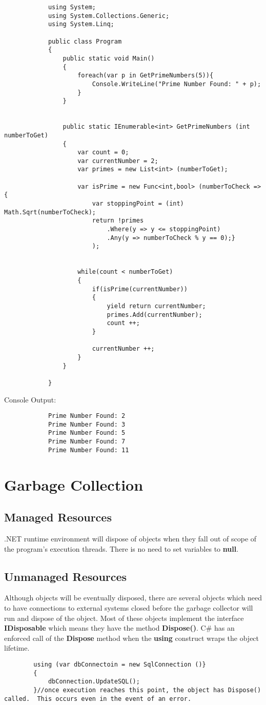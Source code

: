 \documentclass {amsart}
\begin{document}
		\begin{lstlisting}
			using System;
			using System.Collections.Generic;
			using System.Linq;

			public class Program
			{
				public static void Main()
				{
					foreach(var p in GetPrimeNumbers(5)){
						Console.WriteLine("Prime Number Found: " + p);	
					}
				}
				
				
				public static IEnumerable<int> GetPrimeNumbers (int numberToGet)
				{
					var count = 0;
					var currentNumber = 2;
					var primes = new List<int> (numberToGet); 

					var isPrime = new Func<int,bool> (numberToCheck => {
						var stoppingPoint = (int) Math.Sqrt(numberToCheck);
						return !primes
							.Where(y => y <= stoppingPoint)
							.Any(y => numberToCheck % y == 0);}
						); 		
					
					
					while(count < numberToGet)
					{
						if(isPrime(currentNumber))
						{
							yield return currentNumber;
							primes.Add(currentNumber);
							count ++;		   
						}
						
						currentNumber ++;
					}
				}
				
			}

		\end{lstlisting}
	Console Output: 
		\begin{verbatim}
			Prime Number Found: 2
			Prime Number Found: 3
			Prime Number Found: 5
			Prime Number Found: 7
			Prime Number Found: 11
		\end{verbatim}

\section{Garbage Collection}
	\subsection{Managed Resources} .NET runtime environment will dispose of objects when they fall out of scope of the program's execution threads.  There is no need to set variables to {\bf null}.
	\subsection{Unmanaged Resources}  Although objects will be eventually disposed, there are several objects which need to have connections to external systems closed before the garbage collector will run and dispose of the object.  Most of these objects implement the interface {\bf IDisposable} which means they have the method {\bf Dispose()}.  C\#  has an enforced call of the {\bf Dispose} method when the {\bf using} construct wraps the object lifetime.  
	\begin{lstlisting}
		using (var dbConnectoin = new SqlConnection ()}
		{
			dbConnection.UpdateSQL();
		}//once execution reaches this point, the object has Dispose() called.  This occurs even in the event of an error.  
	\end{lstlisting}
\end{document}
